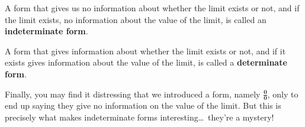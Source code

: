 \documentclass{ximera}
\begin{document}
\begin{definition}
A form that gives us no information about whether the limit exists or not, and if the limit exists, no information about the value of the limit, is
called an \textbf{indeterminate form}.

A form that gives information about whether the limit exists or not, and if it exists gives information about the value of the limit, is called a
\textbf{determinate form}.
\end{definition}  

Finally, you may find it distressing that we introduced a form, namely
$\boldsymbol{\tfrac{0}{0}}$, only to end up saying they give no information on the
value of the limit. But this is precisely what makes
indeterminate forms interesting\dots~they're a mystery!
\end{document}
